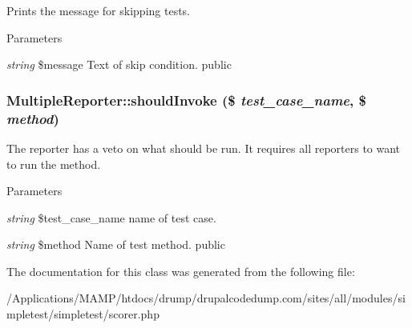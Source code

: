 \label{class_multiple_reporter_a624ac0566b6f0169675309446ee67693}
Prints the message for skipping tests. 
\begin{DoxyParams}{Parameters}
\item[{\em string}]\$message Text of skip condition.  public \end{DoxyParams}
\hypertarget{class_multiple_reporter_adc99084bc0502e8cd8a42837e1f63aba}{
\subsubsection[{shouldInvoke}]{\setlength{\rightskip}{0pt plus 5cm}MultipleReporter::shouldInvoke (\$ {\em test\_\-case\_\-name}, \/  \$ {\em method})}}
\label{class_multiple_reporter_adc99084bc0502e8cd8a42837e1f63aba}
The reporter has a veto on what should be run. It requires all reporters to want to run the method. 
\begin{DoxyParams}{Parameters}
\item[{\em string}]\$test\_\-case\_\-name name of test case. \item[{\em string}]\$method Name of test method.  public \end{DoxyParams}


The documentation for this class was generated from the following file:\begin{DoxyCompactItemize}
\item 
/Applications/MAMP/htdocs/drump/drupalcodedump.com/sites/all/modules/simpletest/simpletest/scorer.php\end{DoxyCompactItemize}
